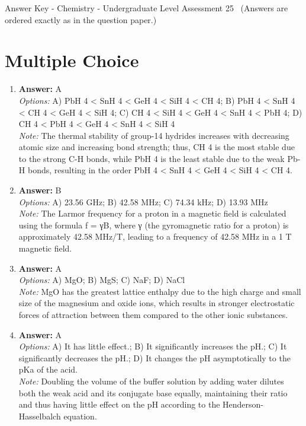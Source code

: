 \documentclass[12pt]{article}
\begin{document}
\begin{center}
Answer Key - Chemistry - Undergraduate Level Assessment 25 \
\small (Answers are ordered exactly as in the question paper.)
\end{center}

\section*{Multiple Choice}
\begin{enumerate}[label=\arabic*.]
\item \textbf{Answer:} A
\\ \textit{Options:} A) PbH 4 \textless{} SnH 4 \textless{} GeH 4 \textless{} SiH 4 \textless{} CH 4; B) PbH 4 \textless{} SnH 4 \textless{} CH 4 \textless{} GeH 4 \textless{} SiH 4; C) CH 4 \textless{} SiH 4 \textless{} GeH 4 \textless{} SnH 4 \textless{} PbH 4; D) CH 4 \textless{} PbH 4 \textless{} GeH 4 \textless{} SnH 4 \textless{} SiH 4
\\ \textit{Note:} The thermal stability of group-14 hydrides increases with decreasing atomic size and increasing bond strength; thus, CH 4 is the most stable due to the strong C-H bonds, while PbH 4 is the least stable due to the weak Pb-H bonds, resulting in the order PbH 4 \textless{} SnH 4 \textless{} GeH 4 \textless{} SiH 4 \textless{} CH 4.
\item \textbf{Answer:} B
\\ \textit{Options:} A) 23.56 GHz; B) 42.58 MHz; C) 74.34 kHz; D) 13.93 MHz
\\ \textit{Note:} The Larmor frequency for a proton in a magnetic field is calculated using the formula f = γB, where γ (the gyromagnetic ratio for a proton) is approximately 42.58 MHz/T, leading to a frequency of 42.58 MHz in a 1 T magnetic field.
\item \textbf{Answer:} A
\\ \textit{Options:} A) MgO; B) MgS; C) NaF; D) NaCl
\\ \textit{Note:} MgO has the greatest lattice enthalpy due to the high charge and small size of the magnesium and oxide ions, which results in stronger electrostatic forces of attraction between them compared to the other ionic substances.
\item \textbf{Answer:} A
\\ \textit{Options:} A) It has little effect.; B) It significantly increases the pH.; C) It significantly decreases the pH.; D) It changes the pH asymptotically to the pKa of the acid.
\\ \textit{Note:} Doubling the volume of the buffer solution by adding water dilutes both the weak acid and its conjugate base equally, maintaining their ratio and thus having little effect on the pH according to the Henderson-Hasselbalch equation.

\end{enumerate}
\end{document}
